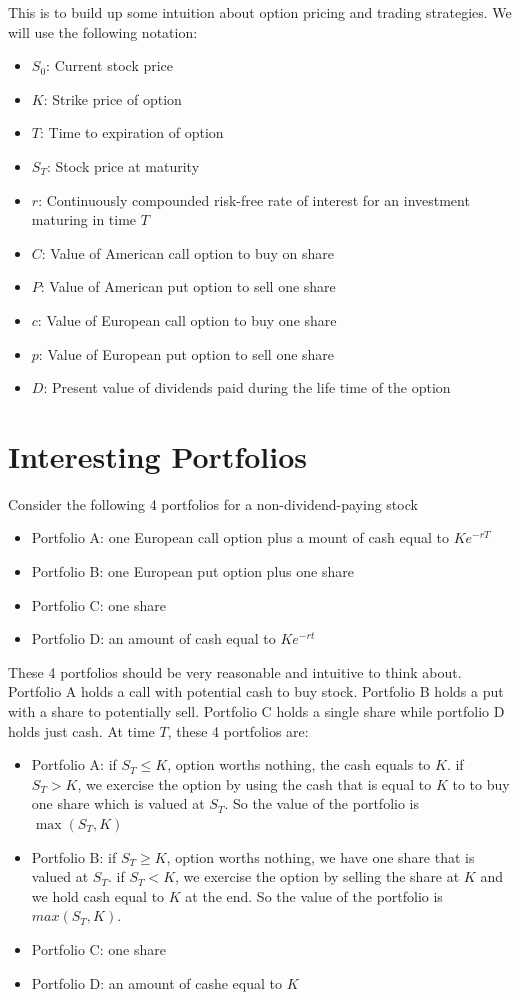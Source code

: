 \documentclass{article}
\begin{document}
This is to build up some intuition about option pricing and trading
strategies. We will use the following notation:
\begin{itemize}
    \item $S_0$: Current stock price
    \item $K$: Strike price of option
    \item $T$: Time to expiration of option
    \item $S_T$: Stock price at maturity
    \item $r$: Continuously compounded risk-free rate of interest for an investment maturing in time $T$
    \item $C$: Value of American call option to buy on share
    \item $P$: Value of American put option to sell one share
    \item $c$: Value of European call option to buy one share
    \item $p$: Value of European put option to sell one share
    \item $D$: Present value of dividends paid during the life time of the option
\end{itemize}

\section{Interesting Portfolios}
Consider the following 4 portfolios for a non-dividend-paying stock
\begin{itemize}
    \item Portfolio A: one European call option plus a mount of cash equal to \(Ke^{-rT}\)
    \item Portfolio B: one European put option plus one share	    
    \item Portfolio C: one share
    \item Portfolio D: an amount of cash equal to \(Ke^{-rt}\)
\end{itemize}
These 4 portfolios should be very reasonable and intuitive to think about. 
Portfolio A holds a call with potential cash to buy stock. 
Portfolio B holds a put with a share to potentially sell. 
Portfolio C holds a single share while portfolio D holds just cash.
At time $T$, these 4 portfolios are:
\begin{itemize}
    \item Portfolio A: 
    if \(S_T \le K\), option worths nothing, the cash equals to $K$.
    if \(S_T > K\), we exercise the option by using the cash that 
    is equal to $K$ to to buy one share which is valued at $S_T$. 
    So the value of the portfolio is \(\max(S_T, K)\)
    \item Portfolio B: 
    if \(S_T \ge K\), option worths nothing, we have one share that is
    valued at $S_T$.
    if \(S_T < K\), we exercise the option by selling the share at $K$ and 
    we hold cash equal to $K$ at the end. 
    So the value of the portfolio is \(max(S_T, K)\). 
    \item Portfolio C: one share
    \item Portfolio D: an amount of cashe equal to $K$
\end{itemize}
\end{document}
